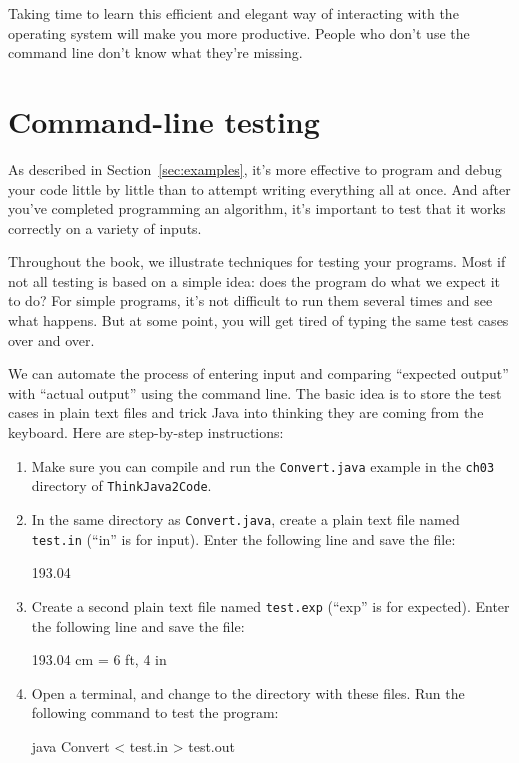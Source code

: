 Taking time to learn this efficient and elegant way of interacting with the operating system will make you more productive.
People who don't use the command line don't know what they're missing.


\section{Command-line testing}
\label{cltesting}

As described in Section~\ref{sec:examples}, it's more effective to program and debug your code little by little than to attempt writing everything all at once.
And after you've completed programming an algorithm, it's important to test that it works correctly on a variety of inputs.

Throughout the book, we illustrate techniques for testing your programs.
Most if not all testing is based on a simple idea: does the program do what we expect it to do?
For simple programs, it's not difficult to run them several times and see what happens.
But at some point, you will get tired of typing the same test cases over and over.

We can automate the process of entering input and comparing ``expected output'' with ``actual output'' using the command line.
The basic idea is to store the test cases in plain text files and trick Java into thinking they are coming from the keyboard.
Here are step-by-step instructions:

\begin{enumerate}

\item Make sure you can compile and run the {\tt Convert.java} example in the {\tt ch03} directory of {\tt ThinkJava2Code}.

\item In the same directory as {\tt Convert.java}, create a plain text file named {\tt test.in} (``in'' is for input).
Enter the following line and save the file:

\begin{stdout}
193.04
\end{stdout}

\item Create a second plain text file named {\tt test.exp} (``exp'' is for expected).
Enter the following line and save the file:

\begin{stdout}
193.04 cm = 6 ft, 4 in
\end{stdout}

\item Open a terminal, and change to the directory with these files.
Run the following command to test the program:

\begin{stdout}
java Convert < test.in > test.out
\end{stdout}

\end{enumerate}

